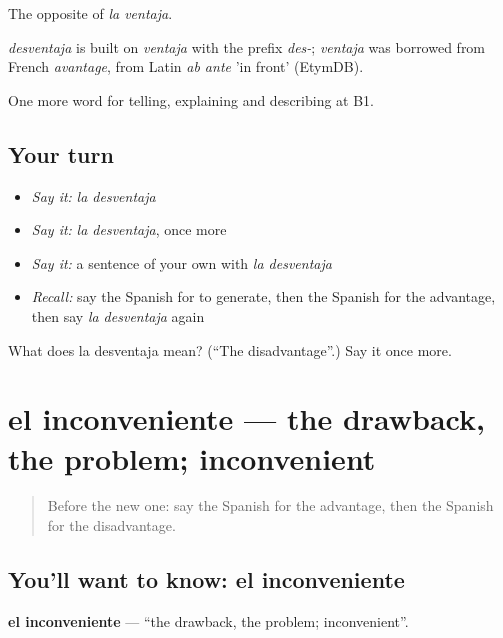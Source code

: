 The opposite of \emph{la ventaja}.

\begin{cousinweb}
\emph{desventaja} is built on \emph{ventaja} with the prefix \emph{des-}; \emph{ventaja} was borrowed from French \emph{avantage}, from Latin \emph{ab ante} 'in front' (EtymDB).
\end{cousinweb}

\begin{grammarlens}[title={What you've built}]
One more word for telling, explaining and describing at B1.
\end{grammarlens}

\subsection*{Your turn}
\begin{itemize}
\raggedright
  \item \emph{Say it:} \emph{la desventaja}
  \item \emph{Say it:} \emph{la desventaja}, once more
  \item \emph{Say it:} a sentence of your own with \emph{la desventaja}
  \item \emph{Recall:} say the Spanish for to generate, then the Spanish for the advantage, then say \emph{la desventaja} again
\end{itemize}

\begin{tcolorbox}[breakable,colback=teal!4,colframe=teal!35!black,title={Before you move on}]
What does la desventaja mean? (\textquotedblleft{}The disadvantage\textquotedblright{}.) Say it once more.
\end{tcolorbox}
\section[el inconveniente]{el inconveniente — the drawback, the problem; inconvenient}

\label{lesson:ES-C584-inconveniente}



\begin{quote}
Before the new one: say the Spanish for the advantage, then the Spanish for the disadvantage.
\end{quote}

\subsection*{You'll want to know: el inconveniente}
\textbf{el inconveniente} — \textquotedblleft{}the drawback, the problem; inconvenient\textquotedblright{}.

